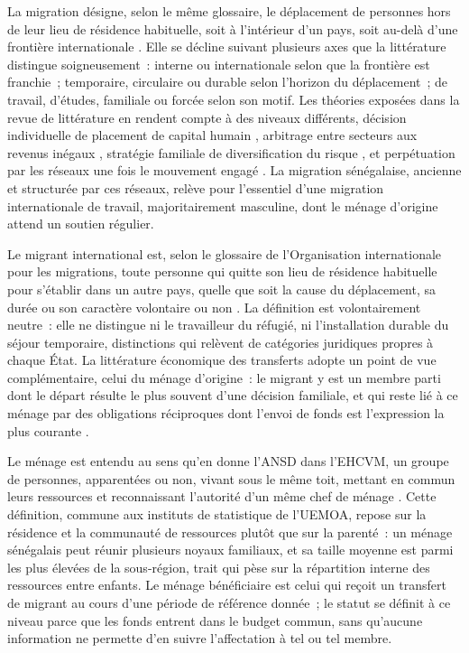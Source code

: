 La migration désigne, selon le même glossaire, le déplacement de
personnes hors de leur lieu de résidence habituelle, soit à l'intérieur
d'un pays, soit au-delà d'une frontière internationale
\parencite{oim2019}. Elle se décline suivant plusieurs axes que la
littérature distingue soigneusement~: interne ou internationale selon que
la frontière est franchie~; temporaire, circulaire ou durable selon
l'horizon du déplacement~; de travail, d'études, familiale ou forcée selon
son motif. Les théories exposées dans la revue de littérature en rendent
compte à des niveaux différents, décision individuelle de placement de
capital humain \parencite{sjaastad1962}, arbitrage entre secteurs aux
revenus inégaux \parencite{harris1970}, stratégie familiale de
diversification du risque \parencite{stark1985}, et perpétuation par les
réseaux une fois le mouvement engagé \parencite{massey1993}. La migration
sénégalaise, ancienne et structurée par ces réseaux, relève pour l'essentiel
d'une migration internationale de travail, majoritairement masculine, dont
le ménage d'origine attend un soutien régulier.

Le migrant international est, selon le glossaire de l'Organisation
internationale pour les migrations, toute personne qui quitte son lieu de
résidence habituelle pour s'établir dans un autre pays, quelle que soit la
cause du déplacement, sa durée ou son caractère volontaire ou non
\parencite{oim2019}. La définition est volontairement neutre~: elle ne
distingue ni le travailleur du réfugié, ni l'installation durable du séjour
temporaire, distinctions qui relèvent de catégories juridiques propres à
chaque État. La littérature économique des transferts adopte un point de
vue complémentaire, celui du ménage d'origine~: le migrant y est un membre
parti dont le départ résulte le plus souvent d'une décision familiale, et
qui reste lié à ce ménage par des obligations réciproques dont l'envoi de
fonds est l'expression la plus courante \parencite{rapport2006,
stark1985}.

Le ménage est entendu au sens qu'en donne l'ANSD dans l'EHCVM, un groupe
de personnes, apparentées ou non, vivant sous le même toit, mettant en
commun leurs ressources et reconnaissant l'autorité d'un même chef de
ménage \parencite{ansd2019}. Cette définition, commune aux instituts de
statistique de l'UEMOA, repose sur la résidence et la communauté de
ressources plutôt que sur la parenté~: un ménage sénégalais peut réunir
plusieurs noyaux familiaux, et sa taille moyenne est parmi les plus élevées
de la sous-région, trait qui pèse sur la répartition interne des ressources
entre enfants. Le ménage bénéficiaire est celui qui reçoit un transfert de
migrant au cours d'une période de référence donnée~; le statut se définit à
ce niveau parce que les fonds entrent dans le budget commun, sans qu'aucune
information ne permette d'en suivre l'affectation à tel ou tel membre.

